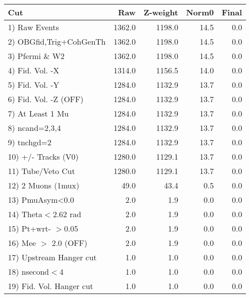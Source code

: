  \begin{table}[h!]\centering
 \begin{tabular}{||l||r|r|r|r||}
 \hline
 \hline
 Cut & Raw & Z-weight & Norm0 & Final \\
 \hline
  1) Raw Events           &      1362.0 &      1198.0 &        14.5 &         0.0 \\
  2) OBGfid,Trig+CohGenTh &      1362.0 &      1198.0 &        14.5 &         0.0 \\
  3) Pfermi \& W2         &      1362.0 &      1198.0 &        14.5 &         0.0 \\
  4) Fid. Vol. -X         &      1314.0 &      1156.5 &        14.0 &         0.0 \\
  5) Fid. Vol. -Y         &      1284.0 &      1132.9 &        13.7 &         0.0 \\
  6) Fid. Vol. -Z (OFF)   &      1284.0 &      1132.9 &        13.7 &         0.0 \\
  7) At Least 1 Mu        &      1284.0 &      1132.9 &        13.7 &         0.0 \\
  8) ncand=2,3,4          &      1284.0 &      1132.9 &        13.7 &         0.0 \\
  9) tnchgd=2             &      1284.0 &      1132.9 &        13.7 &         0.0 \\
 10) +/- Tracks (V0)      &      1280.0 &      1129.1 &        13.7 &         0.0 \\
 11) Tube/Veto Cut        &      1280.0 &      1129.1 &        13.7 &         0.0 \\
 12) 2 Muons (1mux)       &        49.0 &        43.4 &         0.5 &         0.0 \\
 13) PmuAsym<0.0          &         2.0 &         1.9 &         0.0 &         0.0 \\
 14) Theta$<$2.62 rad     &         2.0 &         1.9 &         0.0 &         0.0 \\
 15) Pt+wrt- $>$0.05      &         2.0 &         1.9 &         0.0 &         0.0 \\
 16) Mee $>$ 2.0  (OFF)   &         2.0 &         1.9 &         0.0 &         0.0 \\
 17) Upstream Hanger cut  &         1.0 &         1.0 &         0.0 &         0.0 \\
 18) nsecond$<$4          &         1.0 &         1.0 &         0.0 &         0.0 \\
 19) Fid. Vol. Hanger cut &         1.0 &         1.0 &         0.0 &         0.0 \\

\end{tabular}
\end{table}
